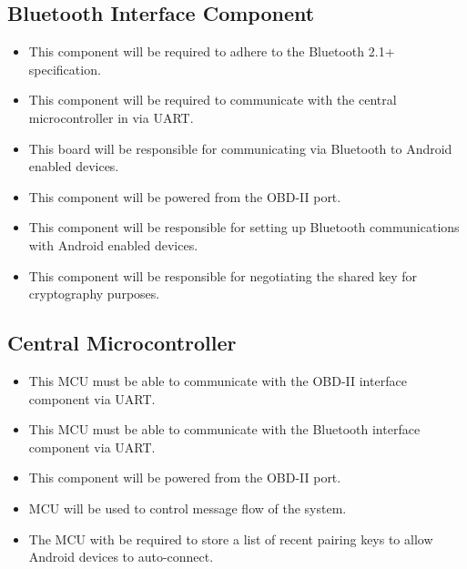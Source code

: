 \documentclass[12pt,letterpaper]{article}
\begin{document}
\subsection{Bluetooth Interface Component}
\begin{itemize}
	\item This component will be required to adhere to the Bluetooth 2.1+ specification.
	\item This component will be required to communicate with the central microcontroller in via UART.
	\item This board will be responsible for communicating via Bluetooth to Android enabled devices.
	\item This component will be powered from the OBD-II port.
	\item This component will be responsible for setting up Bluetooth communications with Android enabled devices.
	\item This component will be responsible for negotiating the shared key for cryptography purposes.
\end{itemize}

\subsection{Central Microcontroller}
\begin{itemize}
	\item This MCU must be able to communicate with the OBD-II interface component via UART.
	\item This MCU must be able to communicate with the Bluetooth interface component via UART.
	\item This component will be powered from the OBD-II port.
	\item MCU will be used to control message flow of the system.
	\item The MCU with be required to store a list of recent pairing keys to allow Android devices to auto-connect.
\end{itemize} 
\end{document}
